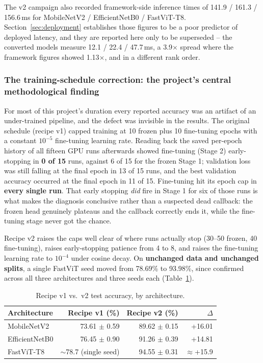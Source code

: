 \documentclass{article}
\begin{document}
The v2 campaign also recorded framework-side inference times of 141.9 / 161.3 / 156.6\,ms for
MobileNetV2 / EfficientNetB0 / FastViT-T8. Section~\ref{sec:deployment} establishes those figures to be a
poor predictor of deployed latency, and they are reported here only to be superseded -- the converted
models measure 12.1 / 22.4 / 47.7\,ms, a 3.9$\times$ spread where the framework figures showed
1.13$\times$, and in a different rank order.

\subsubsection{The training-schedule correction: the project's central methodological finding}
\label{sec:schedule}

For most of this project's duration every reported accuracy was an artifact of an under-trained pipeline,
and the defect was invisible in the results. The original schedule (recipe v1) capped training at 10
frozen plus 10 fine-tuning epochs with a constant $10^{-5}$ fine-tuning learning rate. Reading back the
saved per-epoch history of all fifteen GPU runs afterwards showed fine-tuning (Stage 2) early-stopping in
\textbf{0 of 15} runs, against 6 of 15 for the frozen Stage 1; validation loss was still falling at the
final epoch in 13 of 15 runs, and the best validation accuracy occurred at the final epoch in 11 of 15.
Fine-tuning hit its epoch cap in \textbf{every single run}. That early stopping \textit{did} fire in Stage
1 for six of those runs is what makes the diagnosis conclusive rather than a suspected dead callback: the
frozen head genuinely plateaus and the callback correctly ends it, while the fine-tuning stage never got
the chance.

Recipe v2 raises the caps well clear of where runs actually stop (30--50 frozen, 40 fine-tuning), raises
early-stopping patience from 4 to 8, and raises the fine-tuning learning rate to $10^{-4}$ under cosine
decay. On \textbf{unchanged data and unchanged splits}, a single FastViT seed moved from 78.69\% to
93.98\%, since confirmed across all three architectures and three seeds each (Table~\ref{tab:v1v2}).

\begin{table}[t]
\centering
\caption{Recipe v1 vs.\ v2 test accuracy, by architecture.}
\label{tab:v1v2}
\begin{tabular}{@{}lrrr@{}}
\toprule
Architecture & Recipe v1 (\%) & Recipe v2 (\%) & $\Delta$ \\
\midrule
MobileNetV2 & 73.61 $\pm$ 0.59 & 89.62 $\pm$ 0.15 & +16.01 \\
EfficientNetB0 & 76.45 $\pm$ 0.90 & 91.26 $\pm$ 0.39 & +14.81 \\
FastViT-T8 & $\sim$78.7 (single seed) & 94.55 $\pm$ 0.31 & $\approx$+15.9 \\
\bottomrule
\end{tabular}
\end{table}
\end{document}
